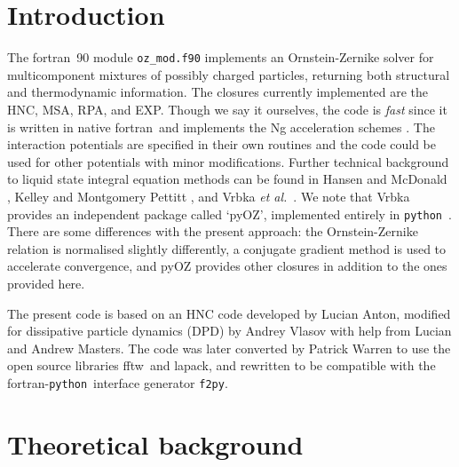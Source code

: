 \documentclass[12pt,a4paper]{article}
\newcommand{\latin}[1]{\emph{#1}}
\newcommand{\etal}{\latin{et al.}}
\newcommand{\FORTRAN}{{\sc fortran}}
\newcommand{\python}{{\tt python}}
\newcommand{\LAPACK}{{\sc lapack}}
\newcommand{\FFTW}{{\sc fftw}}
\begin{document}
\section{Introduction}
%
The \FORTRAN\ 90 module \verb+oz_mod.f90+ implements an
Ornstein-Zernike solver for multicomponent mixtures of possibly
charged particles, returning both structural and thermodynamic
information.  The closures currently implemented are the HNC, MSA,
RPA, and EXP.  Though we say it ourselves, the code is \emph{fast}
since it is written in native \FORTRAN\ and implements the Ng
acceleration schemes \cite{Ng74}.  The interaction potentials are
specified in their own routines and the code could be used for other
potentials with minor modifications.  Further technical background to
liquid state integral equation methods can be found in Hansen and
McDonald \cite{HM06}, Kelley and Montgomery Pettitt \cite{KMP04}, and
Vrbka \etal\ \cite{Vrbka09}.  We note that Vrbka provides an
independent package called `pyOZ', implemented entirely in
\python~\cite{Vrbka09}.  There are some differences with the present
approach: the Ornstein-Zernike relation is normalised slightly
differently, a conjugate gradient method is used to accelerate
convergence, and pyOZ provides other closures in addition to the ones
provided here.

The present code is based on an HNC code developed by Lucian Anton,
modified for dissipative particle dynamics (DPD) by Andrey Vlasov with
help from Lucian and Andrew Masters.  The code was later converted by
Patrick Warren to use the open source libraries \FFTW\ and \LAPACK,
and rewritten to be compatible with the \FORTRAN-\python\ interface
generator \verb+f2py+.

\section{Theoretical background}
%
\end{document}
